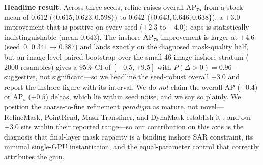 \documentclass[journal]{IEEEtran}
\begin{document}
\textbf{Headline result.} Across three seeds, \textsf{refine} raises overall AP$_{75}$ from a stock mean of $0.612$ ($\{0.615,0.623,0.598\}$) to $0.642$ ($\{0.643,0.646,0.638\}$), a $+3.0$ improvement that is positive on every seed ($+2.3$ to $+4.0$); \textsf{caps} is statistically indistinguishable (mean $0.643$). The inshore AP$_{75}$ improvement is larger at $+4.6$ (seed~0, $0.341\!\rightarrow\!0.387$) and lands exactly on the diagnosed mask-quality half, but an image-level paired bootstrap over the small $46$-image inshore stratum ($2000$ resamples) gives a $95\%$ CI of $[-0.5,+9.5]$ with $P(\Delta\!>\!0)=0.96$---suggestive, not significant---so we headline the seed-robust overall $+3.0$ and report the inshore figure with its interval. We do \emph{not} claim the overall-AP ($+0.4$) or AP$_s$ ($+0.5$) deltas, which lie within seed noise, and we say so plainly. We position the coarse-to-fine refinement \emph{paradigm} as mature, not novel---RefineMask, PointRend, Mask Transfiner, and DynaMask establish it \cite{zhang2021refinemask,kirillov2020pointrend,ke2022masktransfiner,li2023dynamask}, and our $+3.0$ sits within their reported range---so our contribution on this axis is the diagnosis that final-layer mask capacity is a binding inshore SAR constraint, its minimal single-GPU instantiation, and the equal-parameter control that correctly attributes the gain.
\end{document}
